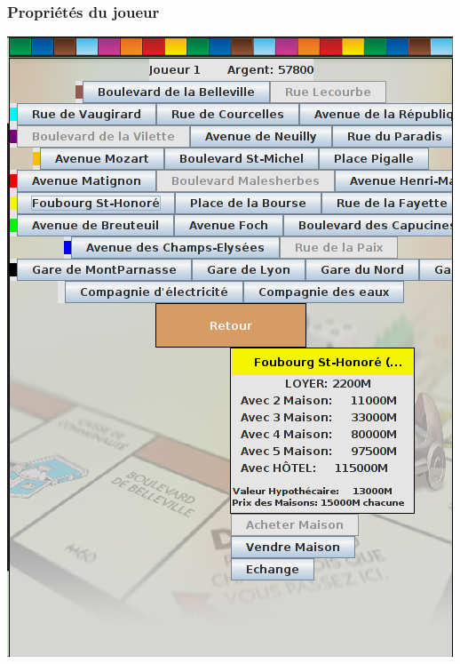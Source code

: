 \documentclass{beamer}
\begin{document}
\begin{darkframes}
    \begin{frame}
 	 \frametitle{Propriétés du joueur}
 	 \begin{center}
 	 \includegraphics[scale=0.35]{./img/proprietes.png}
		
	\end{center}
    \end{frame}
	

\end{darkframes}
\end{document}
